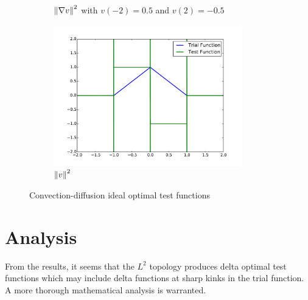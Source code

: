 \documentclass{article}
\begin{document}
\begin{figure}[ht]
\begin{subfigure}[t]{0.45\textwidth}
\caption{$\left\| \nabla v \right\|^2$ with $v(-2)=0.5$ and  $v(2)=-0.5$}
\end{subfigure}
\begin{subfigure}[t]{0.45\textwidth}
\centering
\includegraphics[width=0.9\textwidth]{OptimalTestFunctions/SpecialCases/Confusion1e-1_L2NoBC.pdf}
\caption{$\left\| v \right\|^2$}
\end{subfigure}
\caption{Convection-diffusion ideal optimal test functions}
\end{figure}

\section*{Analysis}
From the results, it seems that the $L^2$ topology produces delta optimal test functions 
which may include delta functions at sharp kinks in the trial function.
A more thorough mathematical analysis is warranted.

\clearpage

\end{document}
